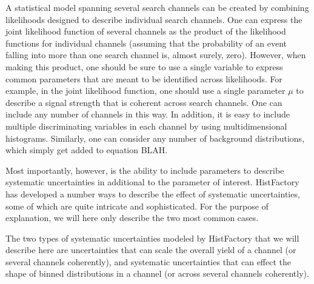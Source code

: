 A statistical model spanning several search channels can be created by combining likelihoods designed to describe individual search channels.
One can express the joint likelihood function of several channels as the product of the likelihood functions for individual channels (assuming that the probability of an event falling into more than one search channel is, almost surely, zero).
However, when making this product, one should be sure to use a single variable to express common parameters that are meant to be identified across likelihoods.
For example, in the joint likelihood function, one should use a single parameter $\mu$ to describe a signal strength that is coherent across search channels.
One can include any number of channels in this way.
In addition, it is easy to include multiple discriminating variables in each channel by using multidimensional histograms.
Similarly, one can consider any number of background distributions, which simply get added to equation BLAH.

Most importantly, however, is the ability to include parameters to describe systematic uncertainties in additional to the parameter of interest.
HistFactory has developed a number ways to describe the effect of systematic uncertainties, some of which are quite intricate and sophisticated.
For the purpose of explanation, we will here only describe the two most common cases.

The two types of systematic uncertainties modeled by HistFactory that we will describe here are uncertainties that can scale the overall yield of a channel (or several channels coherently), and systematic uncertainties that can effect the shape of binned distributions in a channel (or across several channels coherently).

